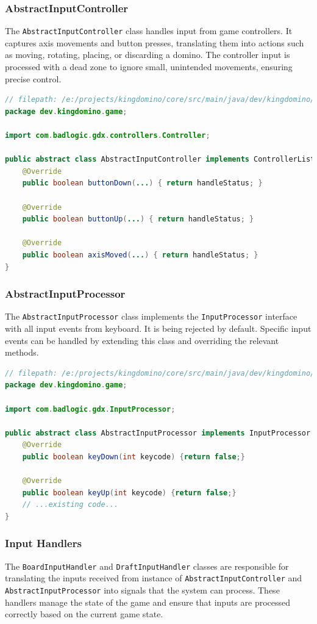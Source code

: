 \documentclass[conference]{IEEEtran}
\begin{document}
\subsubsection{AbstractInputController}
The \texttt{AbstractInputController} class handles input from game controllers.
It captures axis movements and button presses, translating them into actions
such as moving, rotating, placing, or discarding a domino. The controller input
is processed with a dead zone to ignore small, unintended movements, ensuring
precise control.
\begin{lstlisting}[language=Java]
// filepath: /e:/projects/kingdomino/core/src/main/java/dev/kingdomino/game/AbstractInputController.java
package dev.kingdomino.game;

import com.badlogic.gdx.controllers.Controller;

public abstract class AbstractInputController implements ControllerListener {
    @Override
    public boolean buttonDown(...) { return handleStatus; }

    @Override
    public boolean buttonUp(...) { return handleStatus; }

    @Override
    public boolean axisMoved(...) { return handleStatus; }
}
\end{lstlisting}

\subsubsection{AbstractInputProcessor}
The \texttt{AbstractInputProcessor} class implements the
\texttt{InputProcessor} interface with all input events from keyboard. It is
being rejected by default. Specific input events can be handled by extending
this class and overriding the relevant methods.

\begin{lstlisting}[language=Java]
// filepath: /e:/projects/kingdomino/core/src/main/java/dev/kingdomino/game/AbstractInputProcessor.java
package dev.kingdomino.game;

import com.badlogic.gdx.InputProcessor;

public abstract class AbstractInputProcessor implements InputProcessor {
    @Override
    public boolean keyDown(int keycode) {return false;}

    @Override
    public boolean keyUp(int keycode) {return false;}
    // ...existing code...
}
\end{lstlisting}

\subsubsection{Input Handlers}
The \texttt{BoardInputHandler} and \texttt{DraftInputHandler} classes are
responsible for translating the inputs received from instance of
\texttt{AbstractInputController} and \texttt{AbstractInputProcessor} into
signals that the system can process. These handlers manage the state of the
game and ensure that inputs are processed correctly based on the current game
state.
\end{document}
